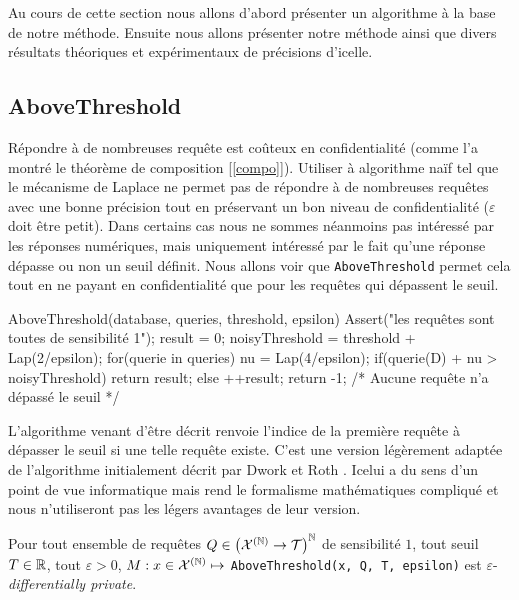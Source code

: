 Au cours de cette section nous allons d'abord présenter un algorithme à la base de notre méthode. Ensuite nous allons présenter notre méthode ainsi que divers résultats théoriques et expérimentaux de précisions d'icelle.

\subsection{AboveThreshold}

Répondre à de nombreuses requête est coûteux en confidentialité (comme l'a montré le théorème de composition [\ref{compo}]). Utiliser à algorithme naïf tel que le mécanisme de {\sc Laplace} \cite{10.1007/11681878_14} ne permet pas de répondre à de nombreuses requêtes avec une bonne précision tout en préservant un bon niveau de confidentialité (\(\varepsilon\) doit être petit). Dans certains cas nous ne sommes néanmoins pas intéressé par les réponses numériques, mais uniquement intéressé par le fait qu'une réponse dépasse ou non un seuil définit. Nous allons voir que \texttt{AboveThreshold} \cite{dwork2014the} permet cela tout en ne payant en confidentialité que pour les requêtes qui dépassent le seuil.

\label{AboveThreshold}
\begin{code}
    AboveThreshold(database, queries, threshold, epsilon){
        Assert("les requêtes sont toutes de sensibilité 1");
        result = 0;
        noisyThreshold = threshold + Lap(2/epsilon);
        for(querie in queries){
            nu = Lap(4/epsilon);
            if(querie(D) + nu > noisyThreshold)
                return result;
            else
                ++result; 
        }
        return -1; /* Aucune requête n'a dépassé le seuil */
    }
\end{code}

L'algorithme venant d'être décrit renvoie l'indice de la première requête à dépasser le seuil si une telle requête existe. C'est une version légèrement adaptée de l'algorithme initialement décrit par {\sc Dwork } et {\sc Roth} \cite[page 57]{dwork2014the}. Icelui a du sens d'un point de vue informatique mais rend le formalisme mathématiques compliqué et nous n'utiliseront pas les légers avantages de leur version.
 
\begin{theorem}
    Pour tout ensemble de requêtes \(Q \in \left( \mathcal X^{(\mathbb{N})} \to  \mathcal T \right)^{\mathbb{N}}\) de sensibilité \(1\), tout seuil \(T \in \mathbb{R}\), tout \(\varepsilon > 0\), \(M : x \in \mathcal X^{(\mathbb{N})} \mapsto \) \texttt{AboveThreshold(x, Q, T, epsilon)} est \(\varepsilon\)-\textit{differentially private}.
\end{theorem}

